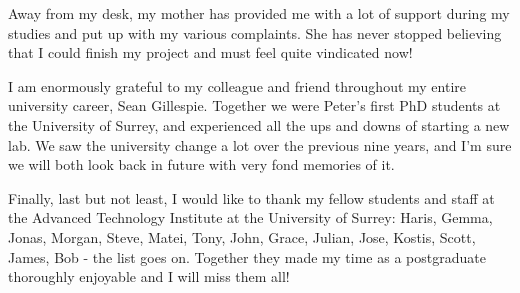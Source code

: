 \documentclass[../thesis/thesis.tex]{subfiles}
\begin{document}
Away from my desk, my mother has provided me with a lot of support during my studies and put up with my various complaints. She has never stopped believing that I could finish my project and must feel quite vindicated now!

I am enormously grateful to my colleague and friend throughout my entire university career, Sean Gillespie. Together we were Peter's first PhD students at the University of Surrey, and experienced all the ups and downs of starting a new lab. We saw the university change a lot over the previous nine years, and I'm sure we will both look back in future with very fond memories of it.

Finally, last but not least, I would like to thank my fellow students and staff at the Advanced Technology Institute at the University of Surrey: Haris, Gemma, Jonas, Morgan, Steve, Matei, Tony, John, Grace, Julian, Jose, Kostis, Scott, James, Bob - the list goes on. Together they made my time as a postgraduate thoroughly enjoyable and I will miss them all!

\newpage
\tableofcontents
{}

\newpage
{}
\listoffigures
\newpage
{}
\listoftables

\glsaddall
\printunsrtglossary[title=List of Abbreviations]

\end{document}
